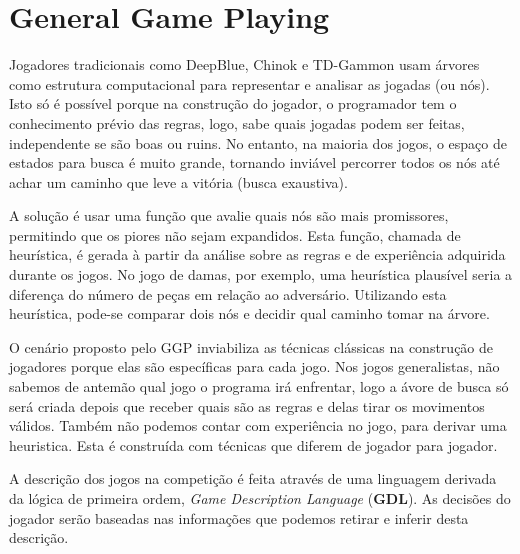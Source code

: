 \section{General Game Playing}
Jogadores tradicionais como DeepBlue\cite{dblue}, Chinok\cite{chinok} e
TD-Gammon\cite{tesauro} usam árvores como estrutura computacional para
representar e analisar as jogadas (ou nós). Isto só é possível porque na
construção do jogador, o programador tem o conhecimento prévio das regras, logo,
sabe quais jogadas podem ser feitas, independente se são boas ou ruins. No
entanto, na maioria dos jogos, o espaço de estados para busca é muito grande,
tornando inviável percorrer todos os nós até achar um caminho que leve a vitória
(busca exaustiva). 

A solução é usar uma função que avalie quais nós são mais promissores, permitindo
que os piores não sejam expandidos. Esta função, chamada de heurística, é gerada
à partir da análise sobre as regras e de experiência adquirida durante os
jogos. No jogo de damas, por exemplo, uma heurística plausível seria a diferença
do número de peças em relação ao adversário. Utilizando esta heurística, pode-se
comparar dois nós e decidir qual caminho tomar na árvore.

O cenário proposto pelo GGP inviabiliza as técnicas clássicas na construção de
jogadores porque elas são específicas para cada jogo. Nos jogos generalistas,
não sabemos de antemão qual jogo o programa irá enfrentar, logo a ávore de busca
só será criada depois que receber quais são as regras e delas tirar os movimentos
válidos. Também não podemos contar com experiência no jogo, para derivar uma
heuristica. Esta é construída com técnicas que diferem de jogador para jogador. 

A descrição dos jogos na competição é feita através de uma linguagem derivada da
lógica de primeira ordem, {\it Game Description Language} ({\bf GDL}). As
decisões do jogador serão baseadas nas informações que podemos retirar e inferir
desta descrição.  
